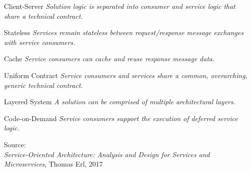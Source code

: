 \documentclass[Screen16to9,17pt]{foils}
\begin{document}
\begin{list2}
\item Client-Server \emph{Solution logic is separated into consumer and service logic that share a technical contract.}
\item Stateless \emph{Services remain stateless between request/response message exchanges with service consumers.}
\item Cache \emph{Service consumers can cache and reuse response message data.}
\item Uniform Contract \emph{Service consumers and services share a common, overarching, generic technical contract.}
\item  Layered System \emph{A solution can be comprised of multiple architectural layers.}
\item Code-on-Demand \emph{Service consumers support the execution of deferred service logic.}
\end{list2}
Source: {\footnotesize\\
\emph{Service‑Oriented Architecture: Analysis and Design for Services and Microservices}, Thomas Erl, 2017}





\slidenext
\end{document}
